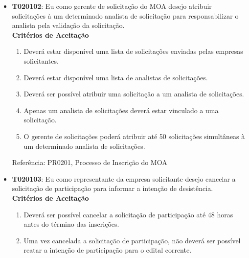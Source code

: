 \begin{itemize}
{\begin{itemize}
{\begin{enumerate}
{\begin{itemize}
						\item{Inscrição Estadual}
						\item{Razão Social}
						\item{Número de Funcionários}
						\item{Área de Atuação}
						\item{Os seguintes campos de Endereço: Bairro, Cidade, UF, Número, CEP}
						\item{Telefone para contato}
						\item{E-mail}
					\end{itemize}}
					\item{Para participar, a Empresa Solicitante deverá conter, no mínimo, 10 funcionários.}
				\end{enumerate}
				Referência: PR0201, Processo de Inscrição do MOA}
				\item{\textbf{T020102}: Eu como gerente de solicitação do MOA desejo atribuir solicitações à um determinado analista de solicitação para responsabilizar o analista pela validação da solicitação.
				\\ \textbf{Critérios de Aceitação}
				\begin{enumerate}
					\item{Deverá estar disponível uma lista de solicitações enviadas pelas empresas solicitantes.}
					\item{Deverá estar disponível uma lista de analistas de solicitações.}
					\item{Deverá ser possível atribuir uma solicitação a um analista de solicitações.}
					\item{Apenas um analista de solicitações deverá estar vinculado a uma solicitação.}
					\item{O gerente de solicitações poderá atribuir até 50 solicitações simultâneas à um determinado analista de solicitações.}
				\end{enumerate}
				Referência: PR0201, Processo de Inscrição do MOA}
				\item{\textbf{T020103}: Eu como representante da empresa solicitante desejo cancelar a solicitação de participação para informar a intenção de desistência.
				\\ \textbf{Critérios de Aceitação}
				\begin{enumerate}
					\item{Deverá ser possível cancelar a solicitação de participação até 48 horas antes do término das inscrições.}
					\item{Uma vez cancelada a solicitação de participação, não deverá ser possível reatar a intenção de participação para o edital corrente.}

\end{enumerate}}
\end{itemize}}
\end{itemize}
